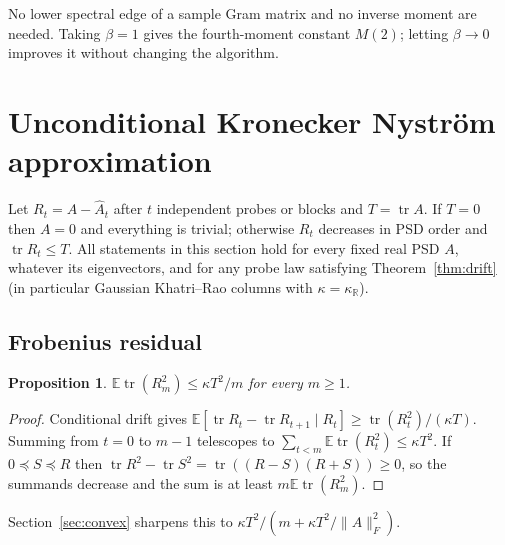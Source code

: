 \documentclass[11pt,a4paper]{article}
\newtheorem{proposition}[theorem]{Proposition}
\theoremstyle{definition}\newtheorem{definition}[theorem]{Definition}
\theoremstyle{remark}\newtheorem{remark}[theorem]{Remark}
\numberwithin{equation}{section}
\newcommand{\E}{\mathbb E}
\newcommand{\R}{\mathbb R}
\newcommand{\tr}{\operatorname{tr}}
\newcommand{\norm}[1]{\lVert#1\rVert}
\begin{document}
No lower spectral edge of a sample Gram matrix and no inverse moment are needed.
Taking $\beta=1$ gives the fourth-moment constant $M(2)$; letting $\beta\to0$
improves it without changing the algorithm.

\section{Unconditional Kronecker Nystr\"om approximation}\label{sec:consequences}
Let $R_t=A-\widehat A_t$ after $t$ independent probes or blocks and $T=\tr A$.
If $T=0$ then $A=0$ and everything is trivial; otherwise $R_t$ decreases in
PSD order and $\tr R_t\le T$. All statements in this section hold for every
fixed real PSD $A$, whatever its eigenvectors, and for any probe law satisfying
Theorem~\ref{thm:drift} (in particular Gaussian Khatri--Rao columns with
$\kappa=\kappa_{\R}$).

\subsection{Frobenius residual}
\begin{proposition}\label{prop:frob}
$\E\tr(R_m^2)\le\kappa T^2/m$ for every $m\ge1$.
\end{proposition}
\begin{proof}
Conditional drift gives $\E[\tr R_t-\tr R_{t+1}\mid R_t]\ge\tr(R_t^2)/(\kappa T)$.
Summing from $t=0$ to $m-1$ telescopes to $\sum_{t<m}\E\tr(R_t^2)\le\kappa T^2$.
If $0\preceq S\preceq R$ then $\tr R^2-\tr S^2=\tr((R-S)(R+S))\ge0$, so the
summands decrease and the sum is at least $m\E\tr(R_m^2)$.
\end{proof}
Section~\ref{sec:convex} sharpens this to $\kappa T^2/(m+\kappa T^2/\norm A_F^2)$.
\end{document}
